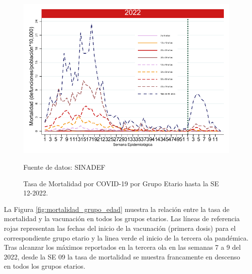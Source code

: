\documentclass[12pt,a4paper,openany]{book}
\begin{document}
\begin{figure}[h]
	\caption{Tasa de Mortalidad por COVID-19 por Grupo Etario hasta la SE 12-2022.}\label{fig:mortalidad_edad}
	\begin{center}
		\includegraphics[width=0.65\linewidth]{../figuras/mortalidad_edad_2021_2022.pdf}
	\end{center}
	{\footnotesize Fuente de datos: SINADEF} 
\end{figure}


La Figura \ref{fig:mortalidad_grupo_edad} muestra la relación entre la tasa de mortalidad y la vacunación en todos los grupos etarios. Las líneas de referencia rojas representan las fechas del inicio de la vacunación (primera dosis) para el correspondiente grupo etario y la linea verde el inicio de la tercera ola pandémica. Tras alcanzar los máximos reportados en la tercera ola en las semanas 7 a 9 del 2022, desde la SE 09 la tasa de mortalidad se muestra francamente en descenso en todos los grupos etarios. 
\end{document}
